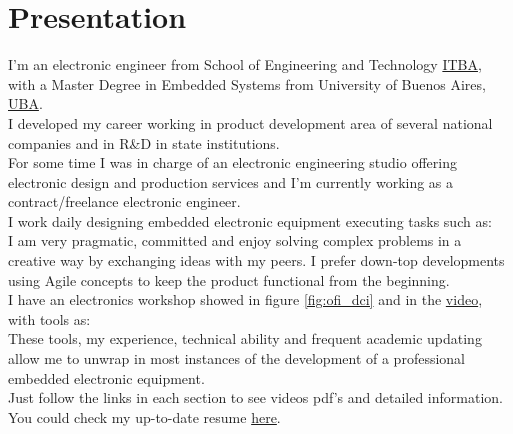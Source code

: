 \section{Presentation}

I'm an electronic engineer from School of Engineering and Technology \href{\linkitba}{ITBA},
with a Master Degree in Embedded Systems from University of Buenos Aires, \href{\linkuba}{UBA}.\\
I developed my career working in product development area of several
national companies and in R\&D in state institutions.\\
For some time I was in charge of an electronic engineering studio offering electronic design
and production services and I'm currently working as a contract/freelance electronic engineer.\\ %
I work daily designing embedded electronic equipment executing tasks such as: \\
I am very pragmatic, committed and enjoy solving complex problems in a creative way by exchanging ideas
with my peers. I prefer down-top developments using Agile concepts to keep the product functional from
the beginning.\\
I have an electronics workshop showed in figure \ref{fig:ofi_dci} and in the \href{\linkofidcitwentyone}{video}, with tools as:\\
These tools, my experience, technical ability and frequent academic updating allow me to unwrap
in most instances of the development of a professional embedded electronic equipment.\\
Just follow the links in each section to see videos pdf's and detailed information.\\
You could check my up-to-date resume \href{\linkgithubcvpdf}{here}.\\

